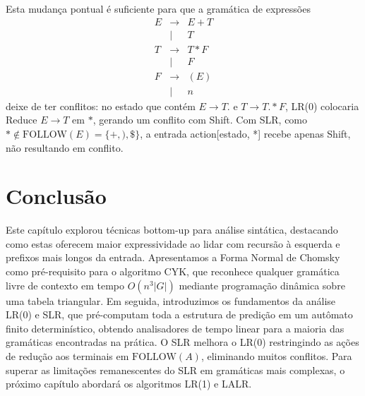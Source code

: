 Esta mudança pontual é suficiente para que a gramática de expressões
\[
  \begin{array}{lcl}
    E & \to  & E + T \\
    & \mid & T \\
    T & \to  & T * F \\
    & \mid & F \\
    F & \to  & (E) \\
    & \mid & n
  \end{array}
\]
deixe de ter conflitos: no estado que contém \(E \to T.\) e \(T
\to T.*F\), LR(0) colocaria Reduce \(E \to T\) em
$*$, gerando um conflito com Shift. Com SLR,
como \(* \notin \mathrm{FOLLOW}(E) = \{+, ), \$\}\), a entrada
action[estado, *] recebe apenas Shift, não resultando em conflito.

\section{Conclusão}

Este capítulo explorou técnicas bottom-up para análise sintática, destacando como estas oferecem maior expressividade ao lidar com recursão à esquerda e prefixos mais longos da entrada. Apresentamos a Forma Normal de Chomsky como pré-requisito para o algoritmo CYK, que reconhece qualquer gramática livre de contexto em tempo $O(n^3 |G|)$ mediante programação dinâmica sobre uma tabela triangular. Em seguida, introduzimos os fundamentos da análise LR(0) e SLR, que pré-computam toda a estrutura de predição em um autômato finito determinístico, obtendo analisadores de tempo linear para a maioria das gramáticas encontradas na prática. O SLR melhora o LR(0) restringindo as ações de redução aos terminais em $\mathrm{FOLLOW}(A)$, eliminando muitos conflitos. Para superar as limitações remanescentes do SLR em gramáticas mais complexas, o próximo capítulo abordará os algoritmos LR(1) e LALR.
